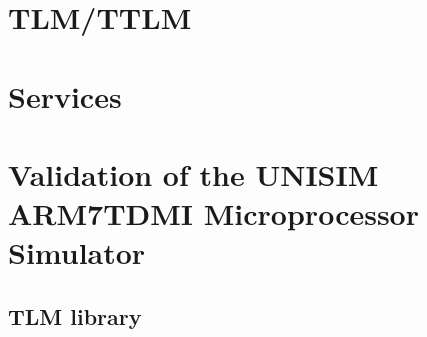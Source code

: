 \documentclass[a4paper,11pt,onecolumn]{mathese}
\begin{document}
\chapter{TLM/TTLM}
\label{tlm_ttlm}


\chapter{Services}
\label{services}


\chapter{Validation of the UNISIM ARM7TDMI Microprocessor Simulator}
\label{arm7tdmi_validation}


\begin{appendix}
\chapter{TLM library}
\label{tlm_appendix}

\end{appendix}

% 
%  

%
%
\end{document}
